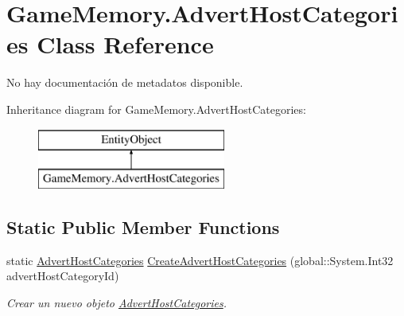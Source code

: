 \hypertarget{class_game_memory_1_1_advert_host_categories}{\section{Game\-Memory.\-Advert\-Host\-Categories Class Reference}
\label{class_game_memory_1_1_advert_host_categories}
}


No hay documentación de metadatos disponible.  


Inheritance diagram for Game\-Memory.\-Advert\-Host\-Categories\-:\begin{figure}[H]
\begin{center}
\leavevmode
\includegraphics[height=2.000000cm]{class_game_memory_1_1_advert_host_categories}
\end{center}
\end{figure}
\subsection*{Static Public Member Functions}
\begin{DoxyCompactItemize}
\item 
static \hyperlink{class_game_memory_1_1_advert_host_categories}{Advert\-Host\-Categories} \hyperlink{class_game_memory_1_1_advert_host_categories_a1b8c6959d44391b88a93f426c94714d1}{Create\-Advert\-Host\-Categories} (global\-::\-System.\-Int32 advert\-Host\-Category\-Id)
\begin{DoxyCompactList}\small\item\em Crear un nuevo objeto \hyperlink{class_game_memory_1_1_advert_host_categories}{Advert\-Host\-Categories}. \end{DoxyCompactList}\end{DoxyCompactItemize}
